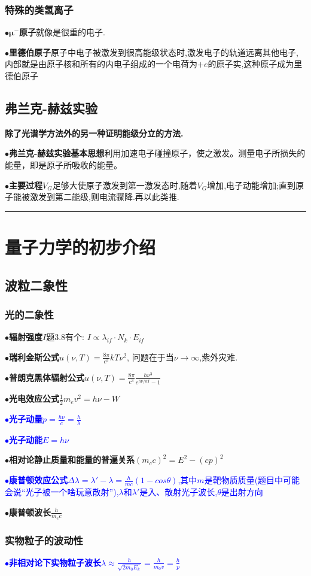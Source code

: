 \documentclass[UTF8]{article}
\newcommand{\keypoint}[2]{$\bullet$\textbf{#1}\quad#2\par}
\begin{document}
\subsubsection{特殊的类氢离子}
\keypoint{$\bm{\mu^-}$原子}{就像是很重的电子.}
\keypoint{里德伯原子}{原子中电子被激发到很高能级状态时,激发电子的轨道远离其他电子,内部就是由原子核和所有的内电子组成的一个电荷为$+e$的原子实,这种原子成为里德伯原子}
\subsection{弗兰克-赫兹实验}
\textbf{除了光谱学方法外的另一种证明能级分立的方法.}\par
\keypoint{弗兰克-赫兹实验基本思想}{利用加速电子碰撞原子，使之激发。测量电子所损失的能量，即是原子所吸收的能量。
}
\keypoint{主要过程}{$V_G$足够大使原子激发到第一激发态时,随着$V_G$增加,电子动能增加;直到原子能被激发到第二能级,则电流骤降.再以此类推.}
\rule{\textwidth}{0.50mm}



\section{量子力学的初步介绍}
\subsection{波粒二象性}
\subsubsection{光的二象性}
\keypoint{辐射强度$I$}{题3.8有个: $I\propto \lambda_{if}\cdot N_k\cdot E_{if}$}
\keypoint{瑞利金斯公式}{$u(\nu,T)=\frac{8\pi}{c^3}kT\nu^2$, 问题在于当$\nu\rightarrow\infty$,紫外灾难.}
\keypoint{普朗克黑体辐射公式}{$u(\nu, T)=\frac{8\pi}{c^{3}}\frac{h\nu^{3}}{e^{h\nu/kT}-1}$}
\keypoint{光电效应公式}{$\frac{1}{2}m_{e}v^2=h\nu-W$}
\textcolor{blue}{\keypoint{光子动量}{$p=\frac{h\nu}{c}=\frac{h}{\lambda}$}}
\textcolor{blue}{\keypoint{光子动能}{$E=h\nu$}}
\keypoint{相对论静止质量和能量的普遍关系}{$(m_cc)^2=E^2-(cp)^2$}
\textcolor{blue}{\keypoint{康普顿效应公式}{$\Delta\lambda=\lambda'-\lambda=\frac{h}{mc}(1-cos\theta)$,其中$m$是靶物质质量(题目中可能会说“光子被一个啥玩意散射”),$\lambda $和$\lambda'$是入、散射光子波长,$\theta$是出射方向}}
\keypoint{康普顿波长}{$\frac{h}{m_{e}c}$}
\subsubsection{实物粒子的波动性}
\textcolor{blue}{\keypoint{非相对论下实物粒子波长}{$\lambda\approx\frac{h}{\sqrt{2m_{0}E_{k}}}=\frac{h}{m_{0}v}=\frac{h}{p}$}}
\end{document}
